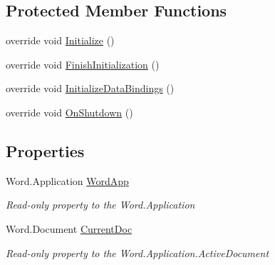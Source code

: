 \subsection*{Protected Member Functions}
\begin{DoxyCompactItemize}
\item 
override void \hyperlink{class_e_u_cases_1_1_e_u_links_checker_word_add_in_1_1_e_u_links_checker_add_in_a9db642ddf75d0fa6106c934b5891fc06}{Initialize} ()
\item 
override void \hyperlink{class_e_u_cases_1_1_e_u_links_checker_word_add_in_1_1_e_u_links_checker_add_in_a26d762318e1b3eb34d83064fea24dc3c}{Finish\+Initialization} ()
\item 
override void \hyperlink{class_e_u_cases_1_1_e_u_links_checker_word_add_in_1_1_e_u_links_checker_add_in_a410a0a2823126f5b6bdb48b57031c063}{Initialize\+Data\+Bindings} ()
\item 
override void \hyperlink{class_e_u_cases_1_1_e_u_links_checker_word_add_in_1_1_e_u_links_checker_add_in_a3f6b73b70e6d736eaaf11c8b239e9e28}{On\+Shutdown} ()
\end{DoxyCompactItemize}
\subsection*{Properties}
\begin{DoxyCompactItemize}
\item 
Word.\+Application \hyperlink{class_e_u_cases_1_1_e_u_links_checker_word_add_in_1_1_e_u_links_checker_add_in_ab392b3757f3328ef8d264c835b2a49c1}{Word\+App}
\begin{DoxyCompactList}\small\item\em Read-\/only property to the Word.\+Application \end{DoxyCompactList}\item 
Word.\+Document \hyperlink{class_e_u_cases_1_1_e_u_links_checker_word_add_in_1_1_e_u_links_checker_add_in_a8279910f00b93afd96ffcd261477c2b0}{Current\+Doc}
\begin{DoxyCompactList}\small\item\em Read-\/only property to the Word.\+Application.\+Active\+Document \end{DoxyCompactList}\end{DoxyCompactItemize}


